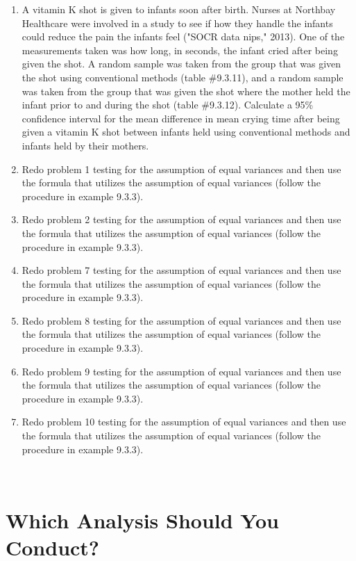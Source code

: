 \documentclass[]{book}
\begin{document}
\begin{enumerate}
\def\labelenumi{\arabic{enumi}.}
\setcounter{enumi}{9}
\item
  A vitamin K shot is given to infants soon after birth. Nurses at Northbay Healthcare were involved in a study to see if how they handle the infants could reduce the pain the infants feel ("SOCR data nips," 2013). One of the measurements taken was how long, in seconds, the infant cried after being given the shot. A random sample was taken from the group that was given the shot using conventional methods (table \#9.3.11), and a random sample was taken from the group that was given the shot where the mother held the infant prior to and during the shot (table \#9.3.12). Calculate a 95\% confidence interval for the mean difference in mean crying time after being given a vitamin K shot between infants held using conventional methods and infants held by their mothers.
\item
  Redo problem 1 testing for the assumption of equal variances and then use the formula that utilizes the assumption of equal variances (follow the procedure in example 9.3.3).
\item
  Redo problem 2 testing for the assumption of equal variances and then use the formula that utilizes the assumption of equal variances (follow the procedure in example 9.3.3).
\item
  Redo problem 7 testing for the assumption of equal variances and then use the formula that utilizes the assumption of equal variances (follow the procedure in example 9.3.3).
\item
  Redo problem 8 testing for the assumption of equal variances and then use the formula that utilizes the assumption of equal variances (follow the procedure in example 9.3.3).
\item
  Redo problem 9 testing for the assumption of equal variances and then use the formula that utilizes the assumption of equal variances (follow the procedure in example 9.3.3).
\item
  Redo problem 10 testing for the assumption of equal variances and then use the formula that utilizes the assumption of equal variances (follow the procedure in example 9.3.3).
\end{enumerate}

\textbf{\\
}

\hypertarget{which-analysis-should-you-conduct}{%
\section{Which Analysis Should You Conduct?}\label{which-analysis-should-you-conduct}}
\end{document}
